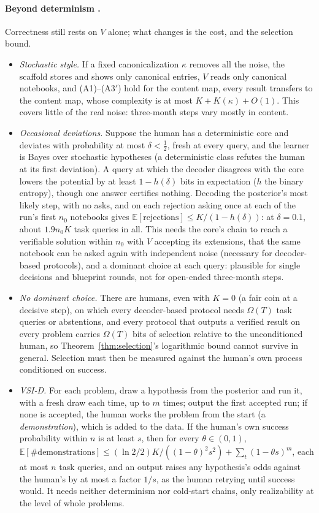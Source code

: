 \documentclass[11pt]{article}
\theoremstyle{definition}
\theoremstyle{remark}
\newcommand{\K}{K}
\newcommand{\Ex}{\mathbb{E}}
\begin{document}
\paragraph{Beyond determinism \cite{threadZ}.} Correctness still rests on $V$ alone; what changes is the cost, and the selection bound.
\begin{itemize}[nosep]
\item \emph{Stochastic style.} If a fixed canonicalization $\kappa$ removes all the noise, the scaffold stores and shows only canonical entries, $V$ reads only canonical notebooks, and (A1)--(A3$'$) hold for the content map, every result transfers to the content map, whose complexity is at most $\K+\K(\kappa)+O(1)$. This covers little of the real noise: three-month steps vary mostly in content.
\item \emph{Occasional deviations.} Suppose the human has a deterministic core and deviates with probability at most $\delta<\frac12$, fresh at every query, and the learner is Bayes over stochastic hypotheses (a deterministic class refutes the human at its first deviation). A query at which the decoder disagrees with the core lowers the potential by at least $1-h(\delta)$ bits in expectation ($h$ the binary entropy), though one answer certifies nothing. Decoding the posterior's most likely step, with no asks, and on each rejection asking once at each of the run's first $n_0$ notebooks gives $\Ex[\text{rejections}]\le\K/(1-h(\delta))$: at $\delta=0.1$, about $1.9n_0\K$ task queries in all. This needs the core's chain to reach a verifiable solution within $n_0$ with $V$ accepting its extensions, that the same notebook can be asked again with independent noise (necessary for decoder-based protocols), and a dominant choice at each query: plausible for single decisions and blueprint rounds, not for open-ended three-month steps.
\item \emph{No dominant choice.} There are humans, even with $\K=0$ (a fair coin at a decisive step), on which every decoder-based protocol needs $\Omega(T)$ task queries or abstentions, and every protocol that outputs a verified result on every problem carries $\Omega(T)$ bits of selection relative to the unconditioned human, so Theorem~\ref{thm:selection}'s logarithmic bound cannot survive in general. Selection must then be measured against the human's own process conditioned on success.
\item \emph{VSI-D.} For each problem, draw a hypothesis from the posterior and run it, with a fresh draw each time, up to $m$ times; output the first accepted run; if none is accepted, the human works the problem from the start (a \emph{demonstration}), which is added to the data. If the human's own success probability within $n$ is at least $s$, then for every $\theta\in(0,1)$, $\Ex[\#\text{demonstrations}]\le(\ln2/2)\K/((1-\theta)^2s^2)+\sum_t(1-\theta s)^m$, each at most $n$ task queries, and an output raises any hypothesis's odds against the human's by at most a factor $1/s$, as the human retrying until success would. It needs neither determinism nor cold-start chains, only realizability at the level of whole problems.
\end{itemize}
\end{document}
